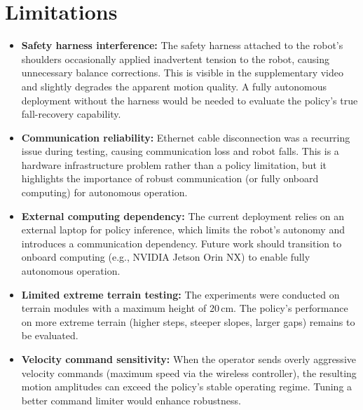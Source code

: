 \section{Limitations}
\label{sec:real_limitations}

\begin{itemize}
    \item \textbf{Safety harness interference:} The safety harness attached to the robot's shoulders occasionally applied inadvertent tension to the robot, causing unnecessary balance corrections. This is visible in the supplementary video and slightly degrades the apparent motion quality. A fully autonomous deployment without the harness would be needed to evaluate the policy's true fall-recovery capability.

    \item \textbf{Communication reliability:} Ethernet cable disconnection was a recurring issue during testing, causing communication loss and robot falls. This is a hardware infrastructure problem rather than a policy limitation, but it highlights the importance of robust communication (or fully onboard computing) for autonomous operation.

    \item \textbf{External computing dependency:} The current deployment relies on an external laptop for policy inference, which limits the robot's autonomy and introduces a communication dependency. Future work should transition to onboard computing (e.g., NVIDIA Jetson Orin NX) to enable fully autonomous operation.

    \item \textbf{Limited extreme terrain testing:} The experiments were conducted on terrain modules with a maximum height of 20\,cm. The policy's performance on more extreme terrain (higher steps, steeper slopes, larger gaps) remains to be evaluated.

    \item \textbf{Velocity command sensitivity:} When the operator sends overly aggressive velocity commands (maximum speed via the wireless controller), the resulting motion amplitudes can exceed the policy's stable operating regime. Tuning a better command limiter would enhance robustness.
\end{itemize}